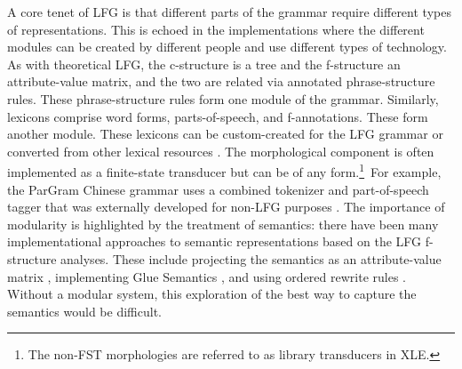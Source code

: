 \documentclass[output=paper,hidelinks]{langscibook}
\begin{document}
       A core tenet of LFG is that different parts of the grammar require different types of representations. This is echoed in the implementations where the different modules can be created by different people and use different types of technology. As with theoretical LFG, the c-structure is a tree and the f-structure an attribute-value matrix, and the two are related via annotated phrase-structure rules. These phrase-structure rules form one module of the grammar. Similarly, lexicons comprise  word forms, parts-of-speech, and f-annotations. These form another module. These lexicons can be custom-created for the LFG grammar or converted from other lexical resources  \citep{kaplannewman97,sheilorsnes06,przepiorkowskietal14,patprz14}. The morphological component is often implemented as a finite-state transducer \citep{kaplanetal04,boegelbuttking2019} but can be of any form.\footnote{The non-FST morphologies are referred to as library transducers in XLE.}\ For example, the  ParGram Chinese grammar uses a combined tokenizer and part-of-speech tagger that was externally developed for non-LFG purposes \citep{Fang-King-GEAF07}. The importance of modularity is highlighted by the treatment of semantics: there have been many implementational approaches to semantic representations based on the LFG f-structure analyses. These include projecting the semantics as an attribute-value matrix \citep{halvorsen83,halvorsenKaplan95,asudeh2006direct,dyvikEtAl2016,dyvikEtAl2019}, implementing Glue Semantics \citep{dalrympleetal93,messmerzylma18}, and using ordered rewrite rules \citep{crouchking06}. Without a modular system, this exploration of the best way to capture the semantics would be difficult.
       
\end{document}

